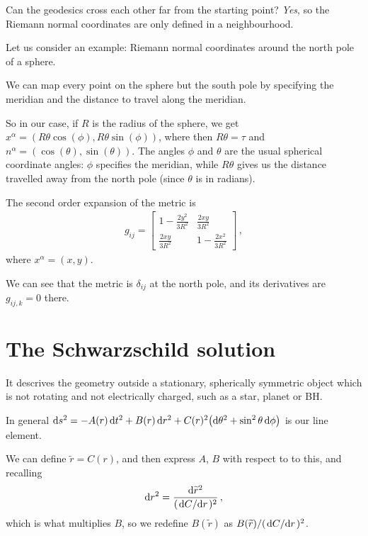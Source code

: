 \documentclass[main.tex]{subfiles}
\begin{document}
Can the geodesics cross each other far from the starting point? \emph{Yes}, so the Riemann normal coordinates are only defined in a neighbourhood.

Let us consider an example: Riemann normal coordinates around the north pole of a sphere.

We can map every point on the sphere but the south pole by specifying the meridian and the distance to travel along the meridian.

So in our case, if \(R\) is the radius of the sphere, we get \(x^{\alpha } = (R \theta \cos(\phi ), R \theta \sin(\phi ))\), where then \(R \theta = \tau \) and \(n^{\alpha } = (\cos(\theta ), \sin(\theta ))\).
The angles \(\phi \) and \(\theta \) are the usual spherical coordinate angles: \(\phi \) specifies the meridian, while \(R\theta \) gives us the distance travelled away from the north pole (since \(\theta \) is in radians).

The second order expansion of the metric is 
%
\begin{align}
  g_{ij} = \left[\begin{array}{cc}
  1 - \frac{2y^2}{3R^2} & \frac{2xy}{3R^2} \\ 
  \frac{2xy}{3R^2} & 1-\frac{2x^2}{3R^2}
  \end{array}\right]
\,,
\end{align}
%
where \(x^{\alpha } = (x, y)\).

We can see that the metric is \(\delta_{ij}\) at the north pole, and its derivatives are \(g_{ij,k}= 0\) there.

\section{The Schwarzschild solution}

It descrives the geometry outside a stationary, spherically symmetric object which is not rotating and not electrically charged, such as a star, planet or BH.

In general \(\dd{s^2} = -A(r) \dd{t^2} + B(r) \dd{r^2} + C(r)^2 \qty(\dd{\theta^2} + \sin^2 \theta \dd{\phi })\) is our line element.

We can define \(\widetilde{r} = C(r)\), and then express \(A\), \(B\) with respect to to this, and recalling 
%
\begin{align}
    \dd{r^2} = 
  \frac{\dd{\widetilde{r}^2} }{(\dv*{C}{r})^2}
\,,
\end{align}
%
which is what multiplies \(B\), so we redefine \(B(\widetilde{r}) \) as \(B(\widetilde{r}) / (\dv*{C}{r})^2\).
\end{document}
